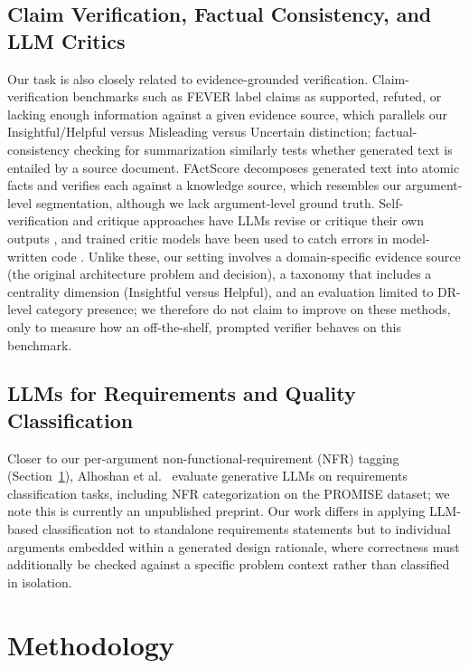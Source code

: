 \documentclass[runningheads]{llncs}
\begin{document}
\subsection{Claim Verification, Factual Consistency, and LLM Critics}
Our task is also closely related to evidence-grounded verification. Claim-verification benchmarks such as FEVER \cite{thorne2018fever} label claims as supported, refuted, or lacking enough information against a given evidence source, which parallels our Insightful/Helpful versus Misleading versus Uncertain distinction; factual-consistency checking for summarization \cite{kryscinski2020evaluating} similarly tests whether generated text is entailed by a source document. FActScore \cite{min2023factscore} decomposes generated text into atomic facts and verifies each against a knowledge source, which resembles our argument-level segmentation, although we lack argument-level ground truth. Self-verification and critique approaches have LLMs revise or critique their own outputs \cite{madaan2023selfrefine}, and trained critic models have been used to catch errors in model-written code \cite{mcaleese2024critics}. Unlike these, our setting involves a domain-specific evidence source (the original architecture problem and decision), a taxonomy that includes a centrality dimension (Insightful versus Helpful), and an evaluation limited to DR-level category presence; we therefore do not claim to improve on these methods, only to measure how an off-the-shelf, prompted verifier behaves on this benchmark.

\subsection{LLMs for Requirements and Quality Classification}
Closer to our per-argument non-functional-requirement (NFR) tagging (Section~\ref{sec:methodology}), Alhoshan et al.\ \cite{alhoshan2025requirements} evaluate generative LLMs on requirements classification tasks, including NFR categorization on the PROMISE dataset; we note this is currently an unpublished preprint. Our work differs in applying LLM-based classification not to standalone requirements statements but to individual arguments embedded within a generated design rationale, where correctness must additionally be checked against a specific problem context rather than classified in isolation.


\section{Methodology}
\label{sec:methodology}
\end{document}
